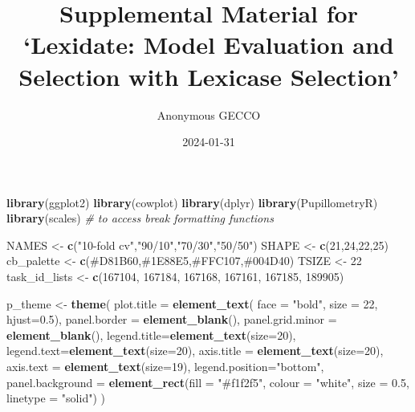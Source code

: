 \documentclass[
]{book}
\title{Supplemental Material for `Lexidate: Model Evaluation and Selection with Lexicase Selection'}
\author{Anonymous GECCO}
\date{2024-01-31}
\newenvironment{Shaded}{\begin{snugshade}}{\end{snugshade}}
\newcommand{\AttributeTok}[1]{\textcolor[rgb]{0.13,0.29,0.53}{#1}}
\newcommand{\CommentTok}[1]{\textcolor[rgb]{0.56,0.35,0.01}{\textit{#1}}}
\newcommand{\DecValTok}[1]{\textcolor[rgb]{0.00,0.00,0.81}{#1}}
\newcommand{\FloatTok}[1]{\textcolor[rgb]{0.00,0.00,0.81}{#1}}
\newcommand{\FunctionTok}[1]{\textcolor[rgb]{0.13,0.29,0.53}{\textbf{#1}}}
\newcommand{\NormalTok}[1]{#1}
\newcommand{\OtherTok}[1]{\textcolor[rgb]{0.56,0.35,0.01}{#1}}
\newcommand{\StringTok}[1]{\textcolor[rgb]{0.31,0.60,0.02}{#1}}
\begin{document}
\maketitle

{
\setcounter{tocdepth}{1}
\tableofcontents
}
\begin{Shaded}
\begin{Highlighting}[]
\FunctionTok{library}\NormalTok{(ggplot2)}
\FunctionTok{library}\NormalTok{(cowplot)}
\FunctionTok{library}\NormalTok{(dplyr)}
\FunctionTok{library}\NormalTok{(PupillometryR)}
\FunctionTok{library}\NormalTok{(scales) }\CommentTok{\# to access break formatting functions}


\NormalTok{NAMES }\OtherTok{\textless{}{-}} \FunctionTok{c}\NormalTok{(}\StringTok{"10{-}fold cv"}\NormalTok{,}\StringTok{"90/10"}\NormalTok{,}\StringTok{"70/30"}\NormalTok{,}\StringTok{"50/50"}\NormalTok{)}
\NormalTok{SHAPE }\OtherTok{\textless{}{-}} \FunctionTok{c}\NormalTok{(}\DecValTok{21}\NormalTok{,}\DecValTok{24}\NormalTok{,}\DecValTok{22}\NormalTok{,}\DecValTok{25}\NormalTok{)}
\NormalTok{cb\_palette }\OtherTok{\textless{}{-}} \FunctionTok{c}\NormalTok{(}\StringTok{\textquotesingle{}\#D81B60\textquotesingle{}}\NormalTok{,}\StringTok{\textquotesingle{}\#1E88E5\textquotesingle{}}\NormalTok{,}\StringTok{\textquotesingle{}\#FFC107\textquotesingle{}}\NormalTok{,}\StringTok{\textquotesingle{}\#004D40\textquotesingle{}}\NormalTok{)}
\NormalTok{TSIZE }\OtherTok{\textless{}{-}} \DecValTok{22}
\NormalTok{task\_id\_lists }\OtherTok{\textless{}{-}} \FunctionTok{c}\NormalTok{(}\DecValTok{167104}\NormalTok{, }\DecValTok{167184}\NormalTok{, }\DecValTok{167168}\NormalTok{, }\DecValTok{167161}\NormalTok{, }\DecValTok{167185}\NormalTok{, }\DecValTok{189905}\NormalTok{)}

\NormalTok{p\_theme }\OtherTok{\textless{}{-}} \FunctionTok{theme}\NormalTok{(}
  \AttributeTok{plot.title =} \FunctionTok{element\_text}\NormalTok{( }\AttributeTok{face =} \StringTok{"bold"}\NormalTok{, }\AttributeTok{size =} \DecValTok{22}\NormalTok{, }\AttributeTok{hjust=}\FloatTok{0.5}\NormalTok{),}
  \AttributeTok{panel.border =} \FunctionTok{element\_blank}\NormalTok{(),}
  \AttributeTok{panel.grid.minor =} \FunctionTok{element\_blank}\NormalTok{(),}
  \AttributeTok{legend.title=}\FunctionTok{element\_text}\NormalTok{(}\AttributeTok{size=}\DecValTok{20}\NormalTok{),}
  \AttributeTok{legend.text=}\FunctionTok{element\_text}\NormalTok{(}\AttributeTok{size=}\DecValTok{20}\NormalTok{),}
  \AttributeTok{axis.title =} \FunctionTok{element\_text}\NormalTok{(}\AttributeTok{size=}\DecValTok{20}\NormalTok{),}
  \AttributeTok{axis.text =} \FunctionTok{element\_text}\NormalTok{(}\AttributeTok{size=}\DecValTok{19}\NormalTok{),}
  \AttributeTok{legend.position=}\StringTok{"bottom"}\NormalTok{,}
  \AttributeTok{panel.background =} \FunctionTok{element\_rect}\NormalTok{(}\AttributeTok{fill =} \StringTok{"\#f1f2f5"}\NormalTok{,}
                                  \AttributeTok{colour =} \StringTok{"white"}\NormalTok{,}
                                  \AttributeTok{size =} \FloatTok{0.5}\NormalTok{, }\AttributeTok{linetype =} \StringTok{"solid"}\NormalTok{)}
\NormalTok{)}
\end{Highlighting}
\end{Shaded}
\end{document}
